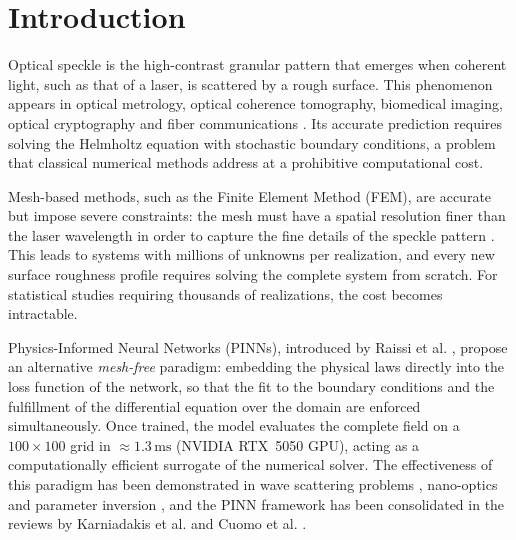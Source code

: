 
\section{Introduction}
\label{sec:intro}

Optical speckle is the high-contrast granular pattern that emerges when coherent
light, such as that of a laser, is scattered by a rough surface.
This phenomenon appears in optical metrology, optical coherence tomography,
biomedical imaging, optical cryptography and fiber communications
\cite{Goodman2007_Speckle}.
Its accurate prediction requires solving the Helmholtz equation with stochastic
boundary conditions, a problem that classical numerical methods address at a
prohibitive computational cost.

Mesh-based methods, such as the Finite Element Method (FEM), are accurate but
impose severe constraints: the mesh must have a spatial resolution finer than the
laser wavelength in order to capture the fine details of the speckle pattern
\cite{Jin2014_FEM}.
This leads to systems with millions of unknowns per realization, and every new
surface roughness profile requires solving the complete system from scratch.
For statistical studies requiring thousands of realizations, the cost becomes
intractable.

Physics-Informed Neural Networks (PINNs), introduced by Raissi et al.
\cite{Raissi2019_PINNs}, propose an alternative \textit{mesh-free} paradigm:
embedding the physical laws directly into the loss function of the network, so
that the fit to the boundary conditions and the fulfillment of the differential
equation over the domain are enforced simultaneously.
Once trained, the model evaluates the complete field on a $100 \times 100$ grid in
$\approx 1.3\,\mathrm{ms}$ (NVIDIA RTX~5050 GPU), acting as a computationally
efficient surrogate of the numerical solver.
The effectiveness of this paradigm has been demonstrated in wave scattering
problems \cite{Fang2020_scattering}, nano-optics and parameter inversion
\cite{Chen2020_nanoptics}, and the PINN framework has been consolidated in the
reviews by Karniadakis et al. \cite{Karniadakis2021_review} and Cuomo et al.
\cite{Cuomo2022_review}.

